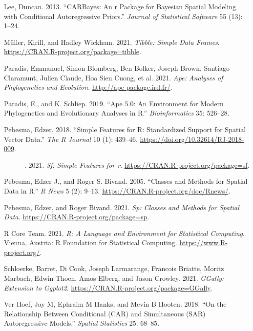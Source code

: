 \documentclass[
]{article}
\newlength{\cslhangindent}
\newlength{\cslentryspacingunit} %
\newenvironment{CSLReferences}[2] %
 {%
  \setlength{\parindent}{0pt}
  \ifodd #1
  \let\oldpar\par
  \def\par{\hangindent=\cslhangindent\oldpar}
  \fi
  \setlength{\parskip}{#2\cslentryspacingunit}
 }%
 {}
\begin{document}
\begin{CSLReferences}{1}{0}
\leavevmode{}%
Lee, Duncan. 2013. {``CARBayes: An r Package for Bayesian Spatial
Modeling with Conditional Autoregressive Priors.''} \emph{Journal of
Statistical Software} 55 (13): 1--24.

\leavevmode{}%
Müller, Kirill, and Hadley Wickham. 2021. \emph{Tibble: Simple Data
Frames}. \url{https://CRAN.R-project.org/package=tibble}.

\leavevmode{}%
Paradis, Emmanuel, Simon Blomberg, Ben Bolker, Joseph Brown, Santiago
Claramunt, Julien Claude, Hoa Sien Cuong, et al. 2021. \emph{Ape:
Analyses of Phylogenetics and Evolution}.
\url{http://ape-package.ird.fr/}.

\leavevmode{}%
Paradis, E., and K. Schliep. 2019. {``Ape 5.0: An Environment for Modern
Phylogenetics and Evolutionary Analyses in {R}.''} \emph{Bioinformatics}
35: 526--28.

\leavevmode{}%
Pebesma, Edzer. 2018. {``{Simple Features for R: Standardized Support
for Spatial Vector Data}.''} \emph{{The R Journal}} 10 (1): 439--46.
\url{https://doi.org/10.32614/RJ-2018-009}.

\leavevmode{}%
---------. 2021. \emph{Sf: Simple Features for r}.
\url{https://CRAN.R-project.org/package=sf}.

\leavevmode{}%
Pebesma, Edzer J., and Roger S. Bivand. 2005. {``Classes and Methods for
Spatial Data in {R}.''} \emph{R News} 5 (2): 9--13.
\url{https://CRAN.R-project.org/doc/Rnews/}.

\leavevmode{}%
Pebesma, Edzer, and Roger Bivand. 2021. \emph{Sp: Classes and Methods
for Spatial Data}. \url{https://CRAN.R-project.org/package=sp}.

\leavevmode{}%
R Core Team. 2021. \emph{R: A Language and Environment for Statistical
Computing}. Vienna, Austria: R Foundation for Statistical Computing.
\url{https://www.R-project.org/}.

\leavevmode{}%
Schloerke, Barret, Di Cook, Joseph Larmarange, Francois Briatte, Moritz
Marbach, Edwin Thoen, Amos Elberg, and Jason Crowley. 2021.
\emph{GGally: Extension to Ggplot2}.
\url{https://CRAN.R-project.org/package=GGally}.

\leavevmode{}%
Ver Hoef, Jay M, Ephraim M Hanks, and Mevin B Hooten. 2018. {``On the
Relationship Between Conditional (CAR) and Simultaneous (SAR)
Autoregressive Models.''} \emph{Spatial Statistics} 25: 68--85.


\end{CSLReferences}
\end{document}

